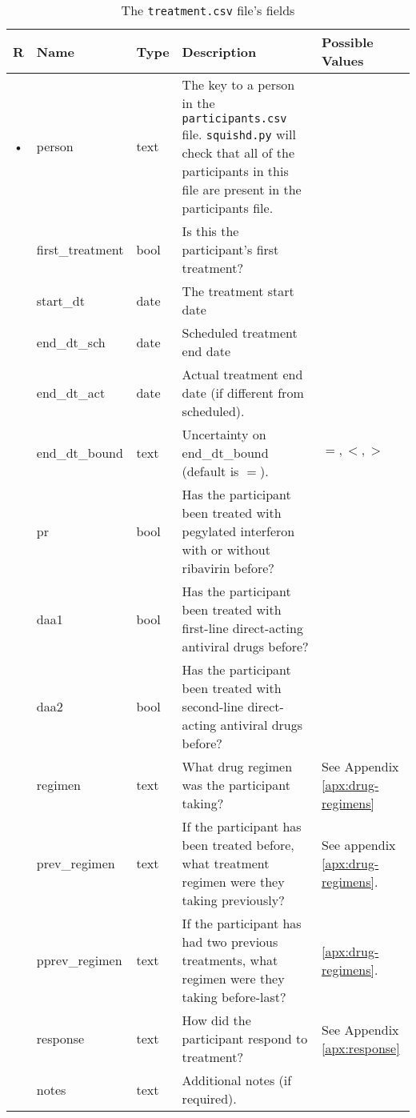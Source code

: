 \documentclass{article}
\begin{document}
\begin{table}[h!]
  \centering
  \caption{The \texttt{treatment.csv} file's fields}
  \label{tbl:treatment.csv}
  \begin{tabular}{cllp{6cm}p{4cm}}
    R & Name                & Type      & Description   & Possible Values\\ \hline
    • & person              & text    & The key to a person in the \texttt{participants.csv}
    file. \texttt{squishd.py} will check that all of the participants in this file
    are present in the participants file. & \\
      & first\_treatment    & bool      & Is this the participant's first treatment? & \\
      & start\_dt           & date      & The treatment start date & \\
      & end\_dt\_sch        & date      & Scheduled treatment end date & \\
      & end\_dt\_act        & date      & Actual treatment end date (if different from scheduled). \\
      & end\_dt\_bound      & text    &
    Uncertainty on end\_dt\_bound (default is $=$). & $=, <, >$ \\
      & pr                  & bool      & Has the participant been treated with pegylated interferon with or without ribavirin before? & \\
      & daa1                & bool      & Has the participant been treated with first-line direct-acting antiviral drugs before? & \\
      & daa2                & bool      & Has the participant been treated with second-line direct-acting antiviral drugs before? & \\
      & regimen             & text      & What drug regimen was the participant taking? & See Appendix \ref{apx:drug-regimens} \\
      & prev\_regimen       & text      & If the participant has been treated before, what treatment regimen were they taking previously?  & See appendix \ref{apx:drug-regimens}. \\
      & pprev\_regimen      & text      & If the participant has had two previous treatments, what regimen were they taking before-last? & \ref{apx:drug-regimens}. \\
      & response            & text      & How did the participant respond to treatment? & See Appendix \ref{apx:response} \\
      & notes               & text    & Additional notes (if required). & \\
  \end{tabular}
\end{table}
\end{document}

